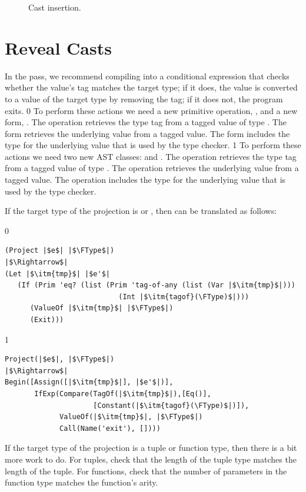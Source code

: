 \documentclass[7x10]{TimesAPriori_MIT}%
\def\racketEd{0}
\def\pythonEd{1}
\def\edition{1}
\newcommand{\pythonColor}[0]{}
\numberwithin{theorem}{chapter}
\numberwithin{definition}{chapter}
\numberwithin{equation}{chapter}
\begin{document}
\begin{figure}[btp]
  \caption{Cast insertion.}
\label{fig:compile-r7-Lany}
\end{figure}



\section{Reveal Casts}
\label{sec:reveal-casts-Lany}


In the  pass, we recommend compiling
 into a conditional expression that checks whether the
value's tag matches the target type; if it does, the value is
converted to a value of the target type by removing the tag; if it
does not, the program exits.
%
{\if\edition\racketEd
%
To perform these actions we need a new primitive operation,
, and a new form, .
The  operation retrieves the type tag from a tagged
value of type .  The  form retrieves the
underlying value from a tagged value.  The  form
includes the type for the underlying value that is used by the type
checker.
%
\fi}
%
{\if\edition\pythonEd\pythonColor
%
To perform these actions we need two new AST classes:  and
. The  operation retrieves the type tag from a
tagged value of type \ANYTY{}.  The  operation retrieves
the underlying value from a tagged value.  The 
operation includes the type for the underlying value that is used by
the type checker.
%
\fi}

If the target type of the projection is \BOOLTY{} or \INTTY{}, then
 can be translated as follows:
\begin{center}
\begin{minipage}{1.0\textwidth}
{\if\edition\racketEd    
\begin{lstlisting}
(Project |$e$| |$\FType$|)
|$\Rightarrow$|
(Let |$\itm{tmp}$| |$e'$|
   (If (Prim 'eq? (list (Prim 'tag-of-any (list (Var |$\itm{tmp}$|)))
                           (Int |$\itm{tagof}(\FType)$|)))
      (ValueOf |$\itm{tmp}$| |$\FType$|)
      (Exit)))
\end{lstlisting}
\fi}
{\if\edition\pythonEd\pythonColor
\begin{lstlisting}
Project(|$e$|, |$\FType$|)
|$\Rightarrow$|
Begin([Assign([|$\itm{tmp}$|], |$e'$|)],
       IfExp(Compare(TagOf(|$\itm{tmp}$|),[Eq()],
                     [Constant(|$\itm{tagof}(\FType)$|)]),
             ValueOf(|$\itm{tmp}$|, |$\FType$|)
             Call(Name('exit'), [])))
\end{lstlisting}
\fi}
\end{minipage}
\end{center}
If the target type of the projection is a tuple or function type, then
there is a bit more work to do. For tuples, check that the length of
the tuple type matches the length of the tuple. For functions, check
that the number of parameters in the function type matches the
function's arity.
\end{document}
